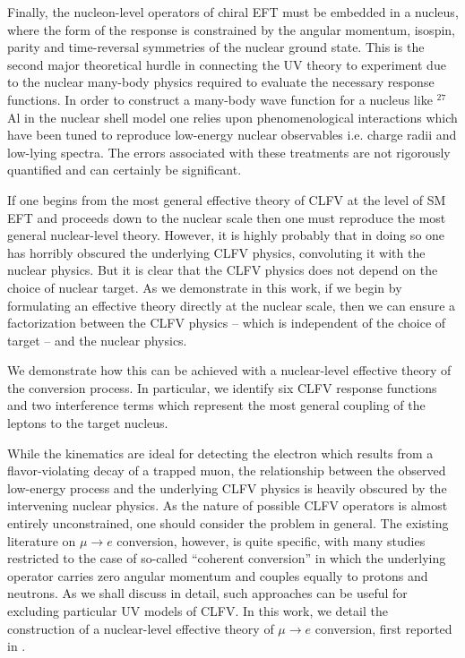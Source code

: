 \documentclass{book}[12pt]
\begin{document}
Finally, the nucleon-level operators of chiral EFT must be embedded in a nucleus, where the form of the response is constrained by the angular momentum, isospin, parity and time-reversal symmetries of the nuclear ground state. This is the second major theoretical hurdle in connecting the UV theory to experiment due to the nuclear many-body physics required to evaluate the necessary response functions. In order to construct a many-body wave function for a nucleus like $^{27}$Al in the nuclear shell model one relies upon phenomenological interactions which have been tuned to reproduce low-energy nuclear observables i.e. charge radii and low-lying spectra. The errors associated with these treatments are not rigorously quantified and can certainly be significant.

If one begins from the most general effective theory of CLFV at the level of SM EFT and proceeds down to the nuclear scale then one must reproduce the most general nuclear-level theory. However, it is highly probably that in doing so one has horribly obscured the underlying CLFV physics, convoluting it with the nuclear physics. But it is clear that the CLFV physics does not depend on the choice of nuclear target. As we demonstrate in this work, if we begin by formulating an effective theory directly at the nuclear scale, then we can ensure a factorization between the CLFV physics -- which is independent of the choice of target -- and the nuclear physics.


We demonstrate how this can be achieved with a nuclear-level effective theory of the conversion process. In particular, we identify six CLFV response functions and two interference terms which represent the most general coupling of the leptons to the target nucleus.
 
While the kinematics are ideal for detecting the electron which results from a flavor-violating decay of a trapped muon, the relationship between the observed low-energy process and the underlying CLFV physics is heavily obscured by the intervening nuclear physics. As the nature of possible CLFV operators is almost entirely unconstrained, one should consider the problem in general. The existing literature on $\mu\rightarrow e$ conversion, however, is quite specific, with many studies restricted to the case of so-called ``coherent conversion'' in which the underlying operator carries zero angular momentum and couples equally to protons and neutrons. As we shall discuss in detail, such approaches can be useful for excluding particular UV models of CLFV. In this work, we detail the construction of a nuclear-level effective theory of $\mu\rightarrow e$ conversion, first reported in \cite{rule2021nucleonlevel}. 
\end{document}
